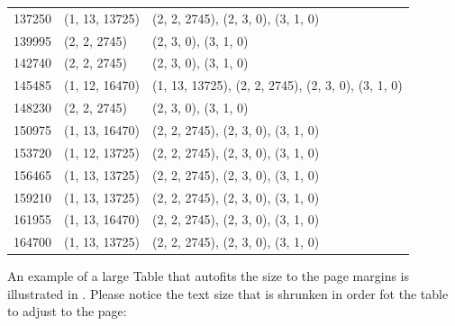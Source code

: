 \begin{center}
\begin{longtable}{|l|l|l|}
137250 & (1, 13, 13725) & (2, 2, 2745), (2, 3, 0), (3, 1, 0) \\
139995 & (2, 2, 2745) & (2, 3, 0), (3, 1, 0) \\
142740 & (2, 2, 2745) & (2, 3, 0), (3, 1, 0) \\
145485 & (1, 12, 16470) & (1, 13, 13725), (2, 2, 2745), (2, 3, 0), (3, 1, 0) \\
148230 & (2, 2, 2745) & (2, 3, 0), (3, 1, 0) \\
150975 & (1, 13, 16470) & (2, 2, 2745), (2, 3, 0), (3, 1, 0) \\
153720 & (1, 12, 13725) & (2, 2, 2745), (2, 3, 0), (3, 1, 0) \\
156465 & (1, 13, 13725) & (2, 2, 2745), (2, 3, 0), (3, 1, 0) \\
159210 & (1, 13, 13725) & (2, 2, 2745), (2, 3, 0), (3, 1, 0) \\
161955 & (1, 13, 16470) & (2, 2, 2745), (2, 3, 0), (3, 1, 0) \\
164700 & (1, 13, 13725) & (2, 2, 2745), (2, 3, 0), (3, 1, 0) \\
\end{longtable}
\end{center}

An example of a large Table that autofits the size to the page margins is illustrated in . Please notice the text size that is shrunken in order fot the table to adjust to the page:

\begin{table}[htbp]
\caption{Sample Table.}\label{tab:very-widetab}
\end{table}
